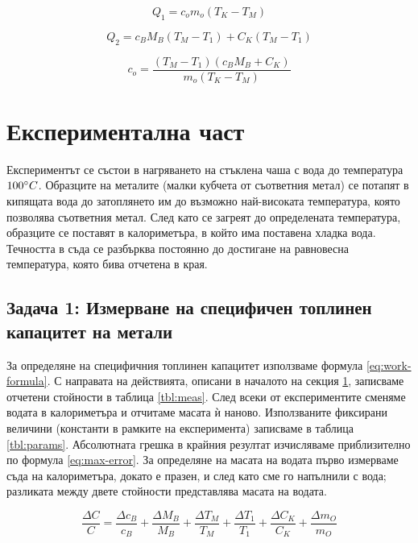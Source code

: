 \documentclass[12pt]{article}
\begin{document}
\begin{equation}\label{eq:q1}
    Q_1 = c_om_o(T_K - T_M)
\end{equation}

\begin{equation}\label{eq:q2}
    Q_2 = c_BM_B(T_M - T_1) + C_K(T_M - T_1)
\end{equation}

\begin{equation}\label{eq:work-formula}
    c_o = \frac{(T_M-T_1)(c_BM_B + C_K)}{m_o(T_K - T_M)}
\end{equation}

\section{Експериментална част}\label{sec:experimental}
Експериментът се състои в нагряването на стъклена чаша с вода до температура $100 \degree C$. Образците на металите (малки кубчета от съответния метал) се потапят в кипящата вода до затоплянето им до възможно най-високата температура, която позволява съответния метал. След като се загреят до определената температура, образците се поставят в калориметъра, в който има поставена хладка вода. Течността в съда се разбърква постоянно до достигане на равновесна температура, която бива отчетена в края. 

\subsection{Задача 1: Измерване на специфичен топлинен капацитет на метали}
За определяне на специфичния топлинен капацитет използваме формула \ref{eq:work-formula}. С направата на действията, описани в началото на секция \ref{sec:experimental}, записваме отчетени стойности в таблица \ref{tbl:meas}. След всеки от експериментите сменяме водата в калориметъра и отчитаме масата ѝ наново. Използваните фиксирани величини (константи в рамките на експеримента) записваме в таблица \ref{tbl:params}. Абсолютната грешка в крайния резултат изчисляваме приблизително по формула \ref{eq:max-error}. За определяне на масата на водата първо измерваме съда на калориметъра, докато е празен, и след като сме го напълнили с вода; разликата между двете стойности представлява масата на водата.

\begin{equation}\label{eq:max-error}
    \frac{\Delta C}{C} = \frac{\Delta c_B}{c_B} + \frac{\Delta M_B}{M_B} + \frac{\Delta T_M}{T_M} + \frac{\Delta T_1}{T_1} + \frac{\Delta C_K}{C_K} + \frac{\Delta m_O}{m_O} 
\end{equation}
\end{document}
